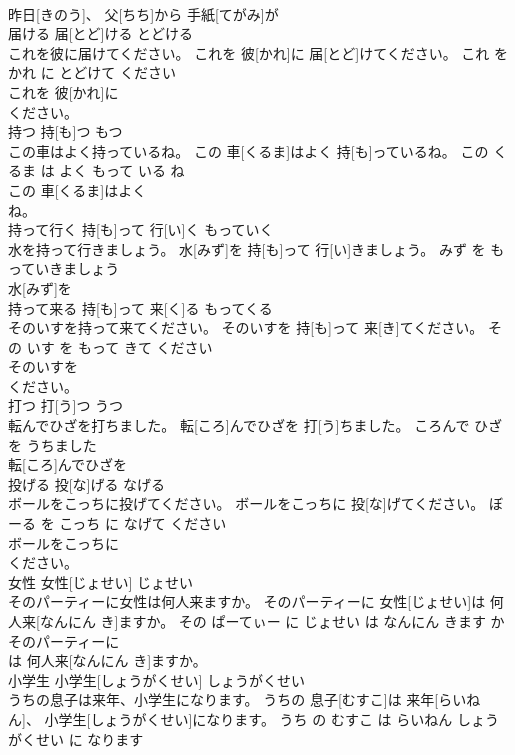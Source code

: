 \documentclass[8pt]{extreport}
\begin{document}
\begin{CJK}{UTF8}{min}
\\	昨日[きのう]、 父[ちち]から 手紙[てがみ]が
\\	届ける	届[とど]ける	とどける	
\\	これを彼に届けてください。	これを 彼[かれ]に 届[とど]けてください。	これ を かれ に とどけて ください	
\\	これを 彼[かれ]に
\\	ください。			
\\	持つ	持[も]つ	もつ	
\\	この車はよく持っているね。	この 車[くるま]はよく 持[も]っているね。	この くるま は よく もって いる ね	
\\	この 車[くるま]はよく
\\	ね。			
\\	持って行く	持[も]って 行[い]く	もっていく	
\\	水を持って行きましょう。	水[みず]を 持[も]って 行[い]きましょう。	みず を もっていきましょう	
\\	水[みず]を
\\	持って来る	持[も]って 来[く]る	もってくる	
\\	そのいすを持って来てください。	そのいすを 持[も]って 来[き]てください。	その いす を もって きて ください	
\\	そのいすを
\\	ください。			
\\	打つ	打[う]つ	うつ	
\\	転んでひざを打ちました。	転[ころ]んでひざを 打[う]ちました。	ころんで ひざ を うちました	
\\	転[ころ]んでひざを
\\	投げる	投[な]げる	なげる	
\\	ボールをこっちに投げてください。	ボールをこっちに 投[な]げてください。	ぼーる を こっち に なげて ください	
\\	ボールをこっちに
\\	ください。			
\\	女性	女性[じょせい]	じょせい	
\\	そのパーティーに女性は何人来ますか。	そのパーティーに 女性[じょせい]は 何人来[なんにん き]ますか。	その ぱーてぃー に じょせい は なんにん きます か	
\\	そのパーティーに
\\	は 何人来[なんにん き]ますか。			
\\	小学生	小学生[しょうがくせい]	しょうがくせい	
\\	うちの息子は来年、小学生になります。	うちの 息子[むすこ]は 来年[らいねん]、 小学生[しょうがくせい]になります。	うち の むすこ は らいねん しょうがくせい に なります	

\end{CJK}
\end{document}
